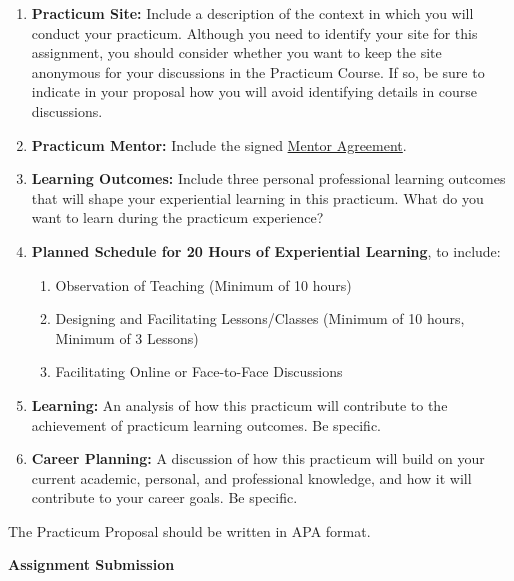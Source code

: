 \documentclass[
]{book}
\providecommand{\tightlist}{%
  \setlength{\itemsep}{0pt}\setlength{\parskip}{0pt}}
\begin{document}
\begin{enumerate}
\def\labelenumi{\arabic{enumi}.}
\tightlist
\item
  \textbf{Practicum Site:} Include a description of the context in which you will conduct your practicum. Although you need to identify your site for this assignment, you should consider whether you want to keep the site anonymous for your discussions in the Practicum Course. If so, be sure to indicate in your proposal how you will avoid identifying details in course discussions.\\
\item
  \textbf{Practicum Mentor:} Include the signed \href{assets/u0/LDRS_667_Mentor_Agreement.pdf}{Mentor Agreement}.\\
\item
  \textbf{Learning Outcomes:} Include three personal professional learning outcomes that will shape your experiential learning in this practicum. What do you want to learn during the practicum experience?\\
\item
  \textbf{Planned Schedule for 20 Hours of Experiential Learning}, to include:

  \begin{enumerate}
  \def\labelenumii{\arabic{enumii}.}
  \tightlist
  \item
    Observation of Teaching (Minimum of 10 hours)\\
  \item
    Designing and Facilitating Lessons/Classes (Minimum of 10 hours, Minimum of 3 Lessons)\\
  \item
    Facilitating Online or Face-to-Face Discussions\\
  \end{enumerate}
\item
  \textbf{Learning:} An analysis of how this practicum will contribute to the achievement of practicum learning outcomes. Be specific.\\
\item
  \textbf{Career Planning:} A discussion of how this practicum will build on your current academic, personal, and professional knowledge, and how it will contribute to your career goals. Be specific.
\end{enumerate}

The Practicum Proposal should be written in APA format.

\textbf{Assignment Submission}
\end{document}
